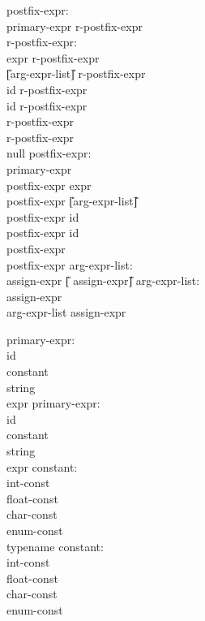 \begin{center}
\PAIR
{
postfix-expr:\\
\>	primary-expr r-postfix-expr\\
r-postfix-expr:\\
\>	\T{\U{[}} expr \T{\U{]}}  r-postfix-expr\\
\>	\T{(} \U{[}arg-expr-list\U{]} \T{)}  r-postfix-expr\\
\>	 id  r-postfix-expr\\
\>	\T{-$>$} id r-postfix-expr\\
\>	\T{++}  r-postfix-expr\\
\>	\T{--}  r-postfix-expr\\
\>	null
}
{
postfix-expr:\\
\>	primary-expr\\
\>	postfix-expr \T{\U{[}} expr \T{\U{]}}\\
\>	postfix-expr \T{(} \U{[}arg-expr-list\U{]} \T{)}\\
\>	postfix-expr  id\\
\>	postfix-expr \T{-$>$} id\\
\>	postfix-expr \T{++}\\
\>	postfix-expr \T{--}
}
\PAIR
{
arg-expr-list:\\
\>	assign-expr \U{[}\T{,} assign-expr\U{]}
}
{
arg-expr-list:\\
\>	assign-expr\\
\>	arg-expr-list \T{,} assign-expr
}

\PAIR
{
primary-expr:\\
\>	id\\
\>	constant\\
\>	string\\
\>	\T{(} expr \T{)}
}
{
primary-expr:\\
\>	id\\
\>	constant\\
\>	string\\
\>	\T{(}expr \T{)}
}
\PAIR
{
constant:\\
\>	int-const\\
\>	float-const\\
\>	char-const\\
\>	enum-const\\
\>	typename
}
{
constant:\\
\>	int-const\\
\>	float-const\\
\>	char-const\\
\>	enum-const
}


\end{center}
  